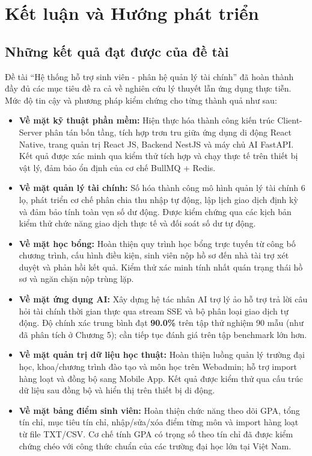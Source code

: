\chapter{Kết luận và Hướng phát triển}
\label{ch:ket-luan}

\section{Những kết quả đạt được của đề tài}
Đề tài ``Hệ thống hỗ trợ sinh viên - phân hệ quản lý tài chính'' đã hoàn thành đầy đủ các mục tiêu đề ra cả về nghiên cứu lý thuyết lẫn ứng dụng thực tiễn. Mức độ tin cậy và phương pháp kiểm chứng cho từng thành quả như sau:
\begin{itemize}
    \item \textbf{Về mặt kỹ thuật phần mềm:} Hiện thực hóa thành công kiến trúc Client-Server phân tán bốn tầng, tích hợp trơn tru giữa ứng dụng di động React Native, trang quản trị React JS, Backend NestJS và máy chủ AI FastAPI. Kết quả được xác minh qua kiểm thử tích hợp và chạy thực tế trên thiết bị vật lý, đảm bảo ổn định của cơ chế BullMQ + Redis.
    \item \textbf{Về mặt quản lý tài chính:} Số hóa thành công mô hình quản lý tài chính 6 lọ, phát triển cơ chế phân chia thu nhập tự động, lập lịch giao dịch định kỳ và đảm bảo tính toàn vẹn số dư động. Được kiểm chứng qua các kịch bản kiểm thử chức năng giao dịch thực tế và đối soát số dư tự động.
    \item \textbf{Về mặt học bổng:} Hoàn thiện quy trình học bổng trực tuyến từ công bố chương trình, cấu hình điều kiện, sinh viên nộp hồ sơ đến nhà tài trợ xét duyệt và phản hồi kết quả. Kiểm thử xác minh tính nhất quán trạng thái hồ sơ và ngăn chặn nộp trùng lặp.
    \item \textbf{Về mặt ứng dụng AI:} Xây dựng hệ tác nhân AI trợ lý ảo hỗ trợ trả lời câu hỏi tài chính thời gian thực qua stream SSE và bộ phân loại giao dịch tự động. Độ chính xác trung bình đạt \textbf{90.0\%} trên tập thử nghiệm 90 mẫu (như đã phân tích ở Chương 5); cần tiếp tục đánh giá trên tập benchmark lớn hơn.
    \item \textbf{Về mặt quản trị dữ liệu học thuật:} Hoàn thiện luồng quản lý trường đại học, khoa/chương trình đào tạo và môn học trên Webadmin; hỗ trợ import hàng loạt và đồng bộ sang Mobile App. Kết quả được kiểm thử qua cấu trúc dữ liệu sau đồng bộ và hiển thị trên thiết bị di động.
    \item \textbf{Về mặt bảng điểm sinh viên:} Hoàn thiện chức năng theo dõi GPA, tổng tín chỉ, mục tiêu tín chỉ, nhập/sửa/xóa điểm từng môn và import hàng loạt từ file TXT/CSV. Cơ chế tính GPA có trọng số theo tín chỉ đã được kiểm chứng chéo với công thức chuẩn của các trường đại học lớn tại Việt Nam.
\end{itemize}

